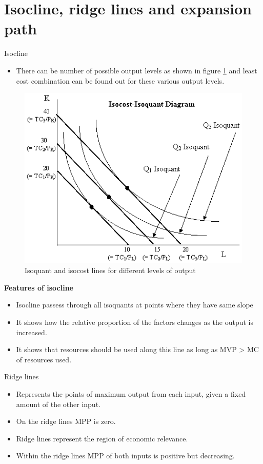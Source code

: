\documentclass[12pt,ignorenonframetext,aspectratio=169]{beamer}
\providecommand{\tightlist}{%
  \setlength{\itemsep}{0pt}\setlength{\parskip}{0pt}}
\begin{document}
\hypertarget{isocline-ridge-lines-and-expansion-path}{%
\section{Isocline, ridge lines and expansion
path}\label{isocline-ridge-lines-and-expansion-path}}

\begin{frame}{Isocline}
\protect\hypertarget{isocline}{}
\begin{itemize}
\tightlist
\item
  There can be number of possible output levels as shown in figure
  \ref{fig:isocline-expansion-path} and least cost combination can be
  found out for these various output levels.
\end{itemize}

\begin{figure}
\includegraphics[width=0.45\linewidth]{./figs/Isoquant_isocost_graph} \caption{Isoquant and isocost lines for different levels of output}\label{fig:isocline-expansion-path}
\end{figure}
\end{frame}

\begin{frame}{}
\protect\hypertarget{section-12}{}
\textbf{Features of isocline}

\begin{itemize}
\tightlist
\item
  Isocline passess through all isoquants at points where they have same
  slope
\item
  It shows how the relative proportion of the factors changes as the
  output is increased.
\item
  It shows that resources should be used along this line as long as MVP
  \textgreater{} MC of resources used.
\end{itemize}
\end{frame}

\begin{frame}{Ridge lines}
\protect\hypertarget{ridge-lines}{}
\begin{itemize}
\tightlist
\item
  Represents the points of maximum output from each input, given a fixed
  amount of the other input.
\item
  On the ridge lines MPP is zero.
\item
  Ridge lines represent the region of economic relevance.
\item
  Within the ridge lines MPP of both inputs is positive but decreasing.
\end{itemize}
\end{frame}
\end{document}
